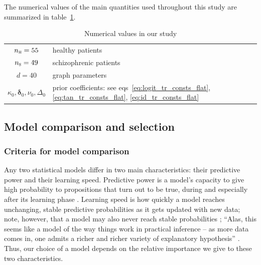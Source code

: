 \documentclass[%
]{frontiersSCNS-nologo} %
\newcommand*{\sect}{\S} %
\newcommand*{\eqns}{eqs}
\newcommand*{\eg}{e.g.}
\newcommand*{\cf}{{cf.}}
\renewcommand*{\|}{\mathpunct{|}}%
\newcommand*{\yhu}{\textsc{h}}
\newcommand*{\yhd}{\textsc{s}}
\newcommand*{\yn}{n}
\newcommand*{\ynh}{\yn_{\yhu}}
\newcommand*{\yns}{\yn_{\yhd}}
\newcommand*{\yd}{d}
\newcommand*{\ymu}{\bm{\delta}}
\newcommand*{\yka}{\kappa}
\newcommand*{\ynu}{\nu}
\newcommand*{\yLa}{\bm{\varDelta}}
\newcommand*{\ymuo}{\ymu_0}
\newcommand*{\ykao}{\yka_0}
\newcommand*{\ynuo}{\ynu_0}
\newcommand*{\yLao}{\yLa_0}
\begin{document}
The numerical values of the main quantities used throughout this study are
summarized in table~\ref{tab:numerical_values}.
\begin{table}[!ht]
  \centering
  \begin{tabular}{cl}
    $\ynh=55$& healthy patients\\
    $\yns=49$& schizophrenic patients\\
    $\yd=40$& graph parameters\\
    $\ykao, \ymuo, \ynuo, \yLao$& prior coefficients: see
                                  \eqns~\eqref{eq:logit_tr_consts_flat},
                                  \eqref{eq:tan_tr_consts_flat}, \eqref{eq:id_tr_consts_flat}
  \end{tabular}
  \caption{Numerical values in our study}
  \label{tab:numerical_values}
\end{table}


\subsection{Model comparison and selection}
\label{sec:model_comparison}

\subsubsection{Criteria for model comparison}
\label{sec:criteria}

Any two statistical models differ in two main characteristics: their
predictive power and their learning speed. Predictive power is a model's
capacity to give high probability to propositions that turn out to be true,
during and especially after its learning phase \citep[\cf][]{dawid1982b}.
Learning speed is how quickly a model reaches unchanging, stable predictive
probabilities as it gets updated with new data; note, however, that a model
may also never reach stable probabilities \citep[see \eg][]{bruno1964,berk1966};
\enquote{Alas, this seems like a model of the way things work in practical
  inference -- as more data comes in, one admits a richer and richer
  variety of explanatory hypothesis} \citep[\sect~3, p.~113]{diaconis1988}.
Thus, our choice of a model depends on the relative importance we give to
these two characteristics.
\end{document}
